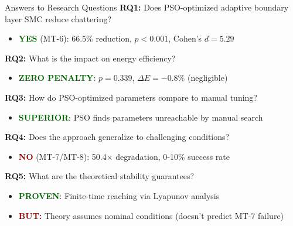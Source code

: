 \documentclass[10pt,aspectratio=169]{beamer}
\newcommand{\emphred}[1]{\textcolor{darkred}{\textbf{#1}}}
\newcommand{\emphgreen}[1]{\textcolor{darkgreen}{\textbf{#1}}}
\begin{document}
\begin{frame}{Answers to Research Questions}
\textbf{RQ1:} Does PSO-optimized adaptive boundary layer SMC reduce chattering?
\begin{itemize}
    \item \emphgreen{YES} (MT-6): 66.5\% reduction, $p < 0.001$, Cohen's $d = 5.29$
\end{itemize}

\textbf{RQ2:} What is the impact on energy efficiency?
\begin{itemize}
    \item \emphgreen{ZERO PENALTY}: $p = 0.339$, $\Delta E = -0.8\%$ (negligible)
\end{itemize}

\textbf{RQ3:} How do PSO-optimized parameters compare to manual tuning?
\begin{itemize}
    \item \emphgreen{SUPERIOR}: PSO finds parameters unreachable by manual search
\end{itemize}

\textbf{RQ4:} Does the approach generalize to challenging conditions?
\begin{itemize}
    \item \emphred{NO} (MT-7/MT-8): 50.4$\times$ degradation, 0-10\% success rate
\end{itemize}

\textbf{RQ5:} What are the theoretical stability guarantees?
\begin{itemize}
    \item \emphgreen{PROVEN}: Finite-time reaching via Lyapunov analysis
    \item \emphred{BUT:} Theory assumes nominal conditions (doesn't predict MT-7 failure)
\end{itemize}
\end{frame}
\end{document}
